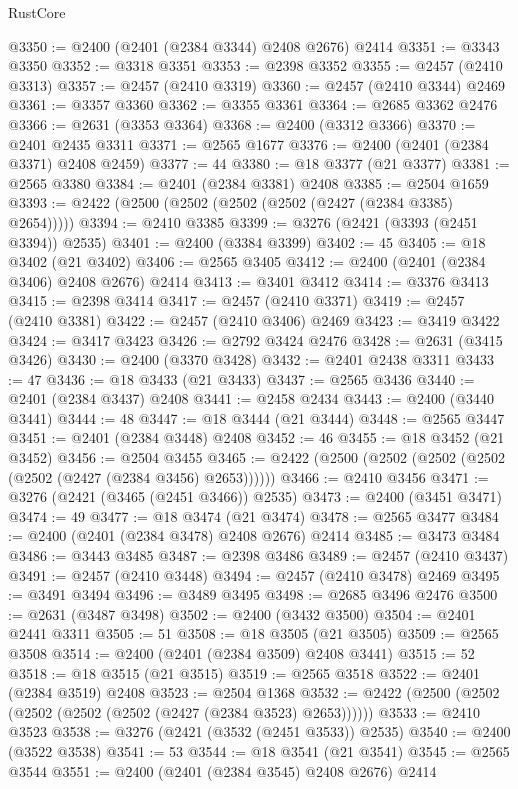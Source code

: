\begin{lexlean}{RustCore}
\begin{coremodule}
@3350 := @2400 (@2401 (@2384 @3344) @2408 @2676) @2414
@3351 := @3343 @3350
@3352 := @3318 @3351
@3353 := @2398 @3352
@3355 := @2457 (@2410 @3313)
@3357 := @2457 (@2410 @3319)
@3360 := @2457 (@2410 @3344) @2469
@3361 := @3357 @3360
@3362 := @3355 @3361
@3364 := @2685 @3362 @2476
@3366 := @2631 (@3353 @3364)
@3368 := @2400 (@3312 @3366)
@3370 := @2401 @2435 @3311
@3371 := @2565 @1677
@3376 := @2400 (@2401 (@2384 @3371) @2408 @2459)
@3377 := 44
@3380 := @18 @3377 (@21 @3377)
@3381 := @2565 @3380
@3384 := @2401 (@2384 @3381) @2408
@3385 := @2504 @1659
@3393 := @2422 (@2500 (@2502 (@2502 (@2502 (@2427 (@2384 @3385) @2654)))))
@3394 := @2410 @3385
@3399 := @3276 (@2421 (@3393 (@2451 @3394)) @2535)
@3401 := @2400 (@3384 @3399)
@3402 := 45
@3405 := @18 @3402 (@21 @3402)
@3406 := @2565 @3405
@3412 := @2400 (@2401 (@2384 @3406) @2408 @2676) @2414
@3413 := @3401 @3412
@3414 := @3376 @3413
@3415 := @2398 @3414
@3417 := @2457 (@2410 @3371)
@3419 := @2457 (@2410 @3381)
@3422 := @2457 (@2410 @3406) @2469
@3423 := @3419 @3422
@3424 := @3417 @3423
@3426 := @2792 @3424 @2476
@3428 := @2631 (@3415 @3426)
@3430 := @2400 (@3370 @3428)
@3432 := @2401 @2438 @3311
@3433 := 47
@3436 := @18 @3433 (@21 @3433)
@3437 := @2565 @3436
@3440 := @2401 (@2384 @3437) @2408
@3441 := @2458 @2434
@3443 := @2400 (@3440 @3441)
@3444 := 48
@3447 := @18 @3444 (@21 @3444)
@3448 := @2565 @3447
@3451 := @2401 (@2384 @3448) @2408
@3452 := 46
@3455 := @18 @3452 (@21 @3452)
@3456 := @2504 @3455
@3465 := @2422 (@2500 (@2502 (@2502 (@2502 (@2502 (@2427 (@2384 @3456) @2653))))))
@3466 := @2410 @3456
@3471 := @3276 (@2421 (@3465 (@2451 @3466)) @2535)
@3473 := @2400 (@3451 @3471)
@3474 := 49
@3477 := @18 @3474 (@21 @3474)
@3478 := @2565 @3477
@3484 := @2400 (@2401 (@2384 @3478) @2408 @2676) @2414
@3485 := @3473 @3484
@3486 := @3443 @3485
@3487 := @2398 @3486
@3489 := @2457 (@2410 @3437)
@3491 := @2457 (@2410 @3448)
@3494 := @2457 (@2410 @3478) @2469
@3495 := @3491 @3494
@3496 := @3489 @3495
@3498 := @2685 @3496 @2476
@3500 := @2631 (@3487 @3498)
@3502 := @2400 (@3432 @3500)
@3504 := @2401 @2441 @3311
@3505 := 51
@3508 := @18 @3505 (@21 @3505)
@3509 := @2565 @3508
@3514 := @2400 (@2401 (@2384 @3509) @2408 @3441)
@3515 := 52
@3518 := @18 @3515 (@21 @3515)
@3519 := @2565 @3518
@3522 := @2401 (@2384 @3519) @2408
@3523 := @2504 @1368
@3532 := @2422 (@2500 (@2502 (@2502 (@2502 (@2502 (@2427 (@2384 @3523) @2653))))))
@3533 := @2410 @3523
@3538 := @3276 (@2421 (@3532 (@2451 @3533)) @2535)
@3540 := @2400 (@3522 @3538)
@3541 := 53
@3544 := @18 @3541 (@21 @3541)
@3545 := @2565 @3544
@3551 := @2400 (@2401 (@2384 @3545) @2408 @2676) @2414

\end{coremodule}
\end{lexlean}
